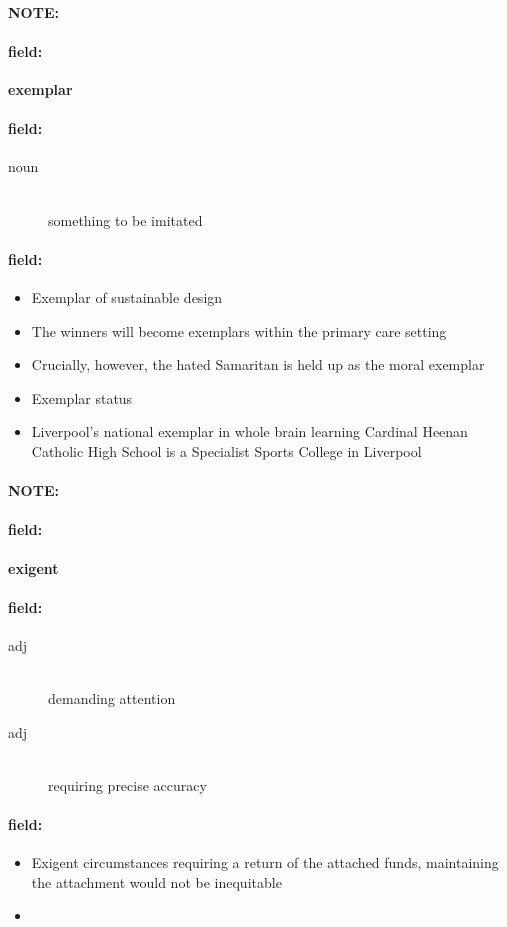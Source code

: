\documentclass[12pt]{article}
\newenvironment{note}{\paragraph{NOTE:}}{}
\newenvironment{field}{\paragraph{field:}}{}
\begin{document}
\begin{note}
\begin{field}
\textbf{\large exemplar}
\end{field}


\begin{field}
\begin{description}
\item[noun] \hfill \\ 
something to be imitated

\end{description}
\end{field}

\begin{field}
\begin{itemize}
\item Exemplar of sustainable design
\item The winners will become exemplars within the primary care setting
\item Crucially, however, the hated Samaritan is held up as the moral exemplar
\item Exemplar status
\item Liverpool's national exemplar in whole brain learning Cardinal Heenan Catholic High School is a Specialist Sports College in Liverpool
\end{itemize}
\end{field}
\end{note}
\begin{note}
\begin{field}
\textbf{\large exigent}
\end{field}


\begin{field}
\begin{description}
\item[adj] \hfill \\ 
demanding attention

\item[adj] \hfill \\ 
requiring precise accuracy

\end{description}
\end{field}

\begin{field}
\begin{itemize}
\item Exigent circumstances requiring a return of the attached funds, maintaining the attachment would not be inequitable
\item 
\end{itemize}
\end{field}
\end{note}
\end{document}
